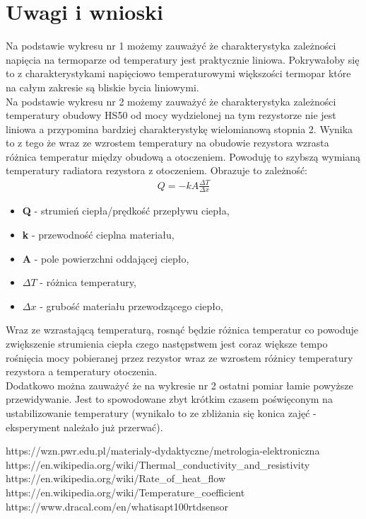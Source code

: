 \documentclass[11pt]{article}
\begin{document}
    \section{Uwagi i wnioski}
    Na podstawie wykresu nr 1 możemy zauważyć że charakterystyka zależności napięcia na termoparze od temperatury jest praktycznie liniowa. Pokrywałoby się to z
    charakterystykami napięciowo temperaturowymi większości termopar które na całym zakresie są bliskie bycia liniowymi.\\
    Na podstawie wykresu nr 2 możemy zauważyć że charakterystyka zależności temperatury obudowy HS50 od mocy wydzielonej na tym rezystorze nie jest liniowa
    a przypomina bardziej charakterystykę wielomianową stopnia 2. Wynika to z tego że wraz ze wzrostem temperatury na obudowie rezystora wzrasta różnica temperatur między
    obudową a otoczeniem. Powoduję to szybszą wymianą temperatury radiatora rezystora z otoczeniem. Obrazuje to zależność:
    \begin{gather*}
        Q=-kA\frac{\Delta T}{\Delta x}
    \end{gather*}
    {\footnotesize
        \begin{itemize}
            \setlength\itemsep{0em}
            \item[] \textbf{Q} - strumień ciepła/prędkość przepływu ciepła,
            \item[] \textbf{k} - przewodność cieplna materiału,
            \item[] \textbf{A} - pole powierzchni oddającej ciepło,
            \item[] \textbf{$\Delta T$} - różnica temperatury,
            \item[] \textbf{$\Delta x$} - grubość materiału przewodzącego ciepło,
        \end{itemize}}
    Wraz ze wzrastającą temperaturą, rosnąć będzie różnica temperatur co powoduje zwiększenie strumienia ciepła czego następstwem jest coraz większe tempo rośnięcia mocy
    pobieranej przez rezystor wraz ze wzrostem różnicy temperatury rezystora a temperatury otoczenia.\\
    \indent Dodatkowo można zauważyć że na wykresie nr 2 ostatni pomiar łamie powyższe przewidywanie. Jest to spowodowane zbyt krótkim czasem poświęconym
    na ustabilizowanie temperatury (wynikało to ze zbliżania się konica zajęć - eksperyment należało już przerwać).


    \vfill
    \footnotesize
    \begin{thebibliography}{9}
        https://wzn.pwr.edu.pl/materialy-dydaktyczne/metrologia-elektroniczna
        https://en.wikipedia.org/wiki/Thermal\_conductivity\_and\_resistivity
        https://en.wikipedia.org/wiki/Rate\_of\_heat\_flow
        https://en.wikipedia.org/wiki/Temperature\_coefficient
        https://www.dracal.com/en/what\-is\-a\-pt100\-rtd\-sensor
    \end{thebibliography}
\end{document}
